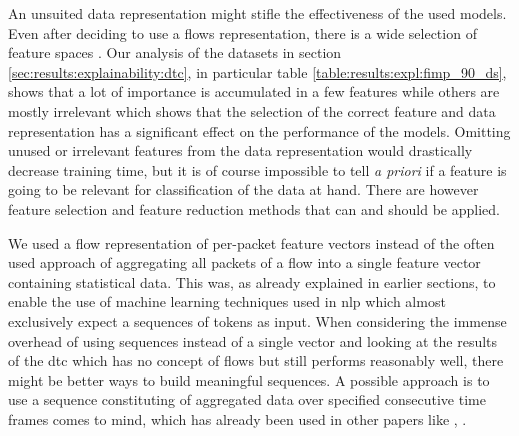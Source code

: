 An unsuited data representation might stifle the effectiveness of the used models. Even after deciding to use a flows representation, there is a wide selection of feature spaces \cite{feature_vectors}.
Our analysis of the datasets in section \ref{sec:results:explainability:dtc}, in particular table \ref{table:results:expl:fimp_90_ds}, shows that a lot of importance is accumulated in a few features while others are mostly irrelevant which shows that the selection of the correct feature and data representation has a significant effect on the performance of the models. Omitting unused or irrelevant features from the data representation would drastically decrease training time, but it is of course impossible to tell \textit{a priori} if a feature is going to be relevant for classification of the data at hand. There are however feature selection and feature reduction methods that can and should be applied. \par
We used a flow representation of per-packet feature vectors instead of the often used approach of aggregating all packets of a flow into a single feature vector containing statistical data. This was, as already explained in earlier sections, to enable the use of machine learning techniques used in \gls{nlp} which almost exclusively expect a sequences of tokens as input. When considering the immense overhead of using sequences instead of a single vector and looking at the results of the \gls{dtc} which has no concept of flows but still performs reasonably well, there might be better ways to build meaningful sequences. A possible approach is to use a sequence constituting of aggregated data over specified consecutive time frames comes to mind, which has already been used in other papers like \cite{attention_model_ids}, \cite{kitsune}. \par

